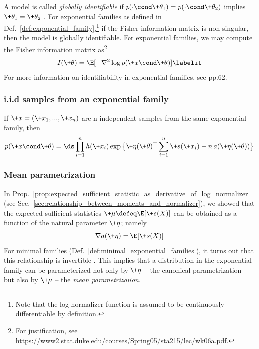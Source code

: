 \documentclass{article} %
\newcommand{\obs}{\+x}
\newcommand{\logNormalizerFunction}{a}
\newcommand{\sufficientStatsFunction}{\+s}
\newcommand{\carrierDensity}{h}
\newcommand{\meanParam}{\+\mu}
\newcommand{\param}{\+\theta}
\newcommand{\naturalParam}{\+\eta}
\begin{document}
A model is called \textit{globally identifiable} if $p(\cdot \cond \param_1) = p(\cdot \cond \param_2)$ implies $\param_1=\param_2$ \cite{cole2020parameter}. For exponential families as defined in Def.~\ref{def:exponential_family},\footnote{Note that the log normalizer function is assumed to be continuously differentiable by definition.} if the Fisher information matrix is non-singular, then the model is globally identifiable.  For exponential families, we may compute the Fisher information matrix as\footnote{For justification, see \url{https://www2.stat.duke.edu/courses/Spring05/sta215/lec/wk06a.pdf.}}
\begin{align*}
I(\param) = \E [ -\nabla^2 \log p(\obs \cond \param)]
\labelit \label{eqn:fisher_information_matrix_for_exponential_families}	
\end{align*}
For more information on identifiability in exponential families, see \cite{cole2020parameter} pp.62. 

\subsubsection{i.i.d samples from an exponential family} \label{sec:iid_samples_from_an_exponential_family}
If $\obs=(\obs_1, ..., \obs_n)$ are n independent samples from the same exponential family, then 
\begin{align}
\label{eqn:exponential_family_iid}
 p(\obs \cond \param) = \ds\prod_{i=1}^n \carrierDensity(\obs_i) \exp \big\{ \naturalParam(\param)^\top \sum_{i=1}^n \sufficientStatsFunction(\obs_i) - n \,\logNormalizerFunction(\naturalParam(\param))\big\} 
 \end{align}


\subsubsection{Mean parametrization} \label{sec:mean_parametrization}

In Prop.~\ref{prop:expected_sufficient_statistic_as_derivative_of_log_normalizer} (see Sec.~\ref{sec:relationship_between_moments_and_normalizer}), we showed that the expected sufficient statistics $\meanParam \defeq \E[\sufficientStatsFunction(X)]$ can be obtained as a function of the natural parameter $\naturalParam$; namely
%
\[ \nabla \logNormalizerFunction(\naturalParam) = \E[\sufficientStatsFunction(X)] \]
%
For minimal families (Def.~\ref{def:minimal_exponential_families}), it turns out that this relationship is invertible \cite[Sec.~8.4]{jordan2010exponential}.   This implies that a distribution in the exponential family can be parameterized not only by $\naturalParam$ -- the canonical parametrization -- but also by $\meanParam$ -- the \textit{mean parametrization}.   
\end{document}
